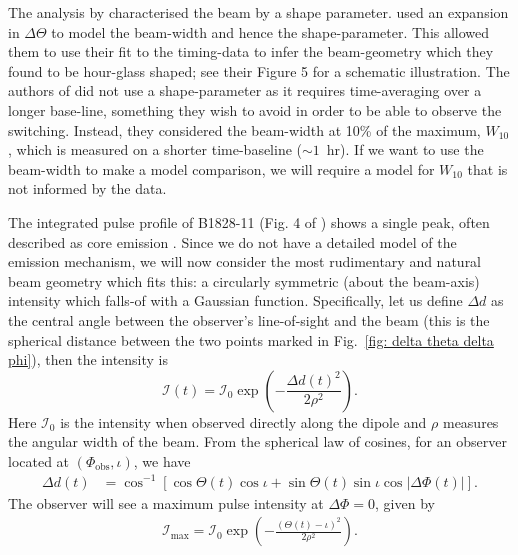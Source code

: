 \documentclass[../full_thesis/full_thesis.tex]{subfiles}
\newcommand{\PhiO}{\Phi_{\mathrm{obs}}}
\newcommand{\In}{\mathcal{I}}
\begin{document}
The analysis by \citet{Stairs2000} characterised the beam by a shape parameter.
\citet{Link2001} used an expansion in $\Delta\Theta$ to model the beam-width
and hence the shape-parameter. This allowed them to use their fit to the
timing-data to infer the beam-geometry which they found to be hour-glass
shaped; see their Figure 5 for a schematic illustration.   The authors of
\citet{Lyne2010} did not use a shape-parameter as it requires time-averaging
over a longer base-line, something they wish to avoid in order to be able to
observe the switching. Instead, they considered the beam-width at 10\% of the
maximum, $W_{10}$, which is measured on a shorter time-baseline ($\sim1$~hr).
If we want to use the beam-width to make a model comparison, we will require a
model for $W_{10}$ that is not informed by the data.

The integrated pulse profile of B1828-11 (Fig. 4 of \citet{Lyne2010})
shows a single peak, often described as  core emission \mbox{\citep{Lyne1988}}.  Since
we do not have a detailed model of the emission mechanism, we will now consider
the most rudimentary and natural beam geometry which fits this: a circularly
symmetric (about the beam-axis) intensity which falls-of with a Gaussian
function.  Specifically, let us define $\Delta d$ as the central angle between
the observer's line-of-sight and the beam (this is the spherical distance
between the two points marked in Fig.~\ref{fig: delta theta delta phi}), then
the intensity is
\begin{equation}
\In(t) = \In_{0}\exp\left(-\frac{\Delta d(t)^{2}}{2\rho^{2}}\right).
\label{eqn: beam intensity}
\end{equation}
Here $\In_0$ is the intensity when observed directly along the dipole and
$\rho$ measures the angular width of the beam.
From the spherical law of cosines, for an observer located at $(\PhiO, \iota)$,
we have
\begin{align}
\Delta d(t) &= \cos^{-1}\left[\cos\Theta(t)\cos\iota +
                              \sin\Theta(t)\sin\iota\cos|\Delta\Phi(t)|\right].
\label{eqn: angular sep}
\end{align}
The observer will see a maximum pulse intensity at $\Delta\Phi = 0$, given by
\begin{align}
\In_\textrm{max} = \In_{0} \exp\left(
    -\frac{\left(\Theta(t) - \iota\right)^{2}}
          {2\rho^{2}}\right).
\label{eqn: imax}
\end{align}
\end{document}
